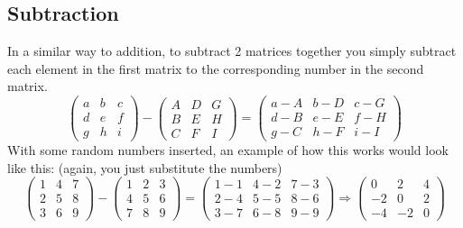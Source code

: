 \documentclass{article}
\begin{document}
\subsection{Subtraction}
In a similar way to addition, to subtract 2 matrices together you simply subtract each element in the first matrix to the corresponding number in the second matrix.
\begin{equation*}
	\begin{pmatrix}
		a & b & c\\
		d & e & f\\
		g & h & i
	\end{pmatrix}
	-
	\begin{pmatrix}
		A & D & G\\
		B & E & H\\
		C & F & I
	\end{pmatrix}
	=
	\begin{pmatrix}
		a-A & b-D & c-G\\
		d-B & e-E & f-H\\
		g-C & h-F & i-I
	\end{pmatrix}
\end{equation*}
With some random numbers inserted, an example of how this works would look like this: (again, you just substitute the numbers)
\begin{equation*}
	\begin{pmatrix}
		1 & 4 & 7\\
		2 & 5 & 8\\
		3 & 6 & 9
	\end{pmatrix}
	-
	\begin{pmatrix}
		1 & 2 & 3\\
		4 & 5 & 6\\
		7 & 8 & 9
	\end{pmatrix}
	=
	\begin{pmatrix}
		1-1 & 4-2 & 7-3\\
		2-4 & 5-5 & 8-6\\
		3-7 & 6-8 & 9-9
	\end{pmatrix}
	\Rightarrow
	\begin{pmatrix}
		0 & 2 & 4\\
		-2 & 0 & 2\\
		-4 & -2 & 0
	\end{pmatrix}
\end{equation*}
\end{document}
